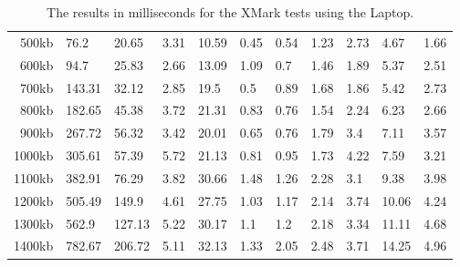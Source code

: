 \begin {table}[htpb]
\begin{tabular}{r|l|l|l|l|l|l|l|l|l|l}
500kb&76.2&20.65&3.31&10.59&0.45&0.54&1.23&2.73&4.67&1.66\\
600kb&94.7&25.83&2.66&13.09&1.09&0.7&1.46&1.89&5.37&2.51\\
700kb&143.31&32.12&2.85&19.5&0.5&0.89&1.68&1.86&5.42&2.73\\
800kb&182.65&45.38&3.72&21.31&0.83&0.76&1.54&2.24&6.23&2.66\\
900kb&267.72&56.32&3.42&20.01&0.65&0.76&1.79&3.4&7.11&3.57\\
1000kb&305.61&57.39&5.72&21.13&0.81&0.95&1.73&4.22&7.59&3.21\\
1100kb&382.91&76.29&3.82&30.66&1.48&1.26&2.28&3.1&9.38&3.98\\
1200kb&505.49&149.9&4.61&27.75&1.03&1.17&2.14&3.74&10.06&4.24\\
1300kb&562.9&127.13&5.22&30.17&1.1&1.2&2.18&3.34&11.11&4.68\\
1400kb&782.67&206.72&5.11&32.13&1.33&2.05&2.48&3.71&14.25&4.96\\
 \end{tabular}
\caption{The results in milliseconds for the XMark tests using the Laptop.}
\label{tab:xmark-laptop}
\end {table}
